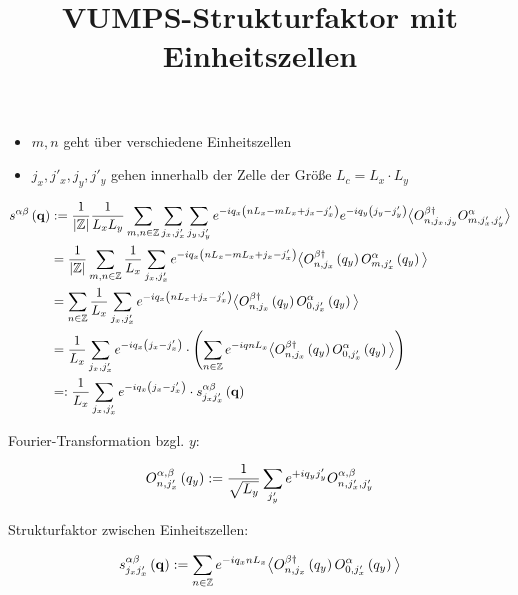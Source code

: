 \documentclass[12pt,paper=a4,BCOR=16mm]{article}
\title{VUMPS-Strukturfaktor mit Einheitszellen}
\begin{document}
\maketitle

\begin{itemize}
\item $m,n$ geht \"uber verschiedene Einheitszellen
\item $j_x,j'_x,j_y,j'_y$ gehen innerhalb der Zelle der Gr\"o{\ss}e $L_c=L_x \cdot L_y$
\end{itemize}

\begin{equation}
\begin{split}
s^{\alpha\beta}\left(\mathbf{q}\right) &:=\frac{1}{\left|\mathbb{Z}\right|}  \frac{1}{L_xL_y} \sum_{m,n\in\mathbb{Z}} \sum_{j_x,j'_x} \sum_{j_y,j'_y} e^{-iq_x\left(nL_x-mL_x+j_x-j'_x\right)} e^{-iq_y\left(j_y-j'_y\right)} \big< O^{\beta\dagger}_{n,j_x,j_y} O^{\alpha}_{m,j'_x,j'_y} \big>\\
                      &= \frac{1}{\left|\mathbb{Z}\right|} \sum_{m,n\in\mathbb{Z}} \frac{1}{L_x} \sum_{j_x,j'_x} e^{-iq_x\left(nL_x-mL_x+j_x-j'_x\right)} \big< O^{\beta\dagger}_{n,j_x}\left(q_y\right) O^{\alpha}_{m,j'_x}\left(q_y\right) \big>\\
                      &= \sum_{n\in\mathbb{Z}} \frac{1}{L_x} \sum_{j_x,j'_x} e^{-iq_x\left(nL_x+j_x-j'_x\right)} \big< O^{\beta\dagger}_{n,j_x}\left(q_y\right) O^{\alpha}_{0,j'_x}\left(q_y\right) \big>\\
                      &= \frac{1}{L_x} \sum_{j_x,j'_x} e^{-iq_x\left(j_x-j'_x\right)} \cdot \left( \sum_{n\in\mathbb{Z}} e^{-iqnL_x} \big< O^{\beta\dagger}_{n,j_x}\left(q_y\right) O^{\alpha}_{0,j'_x}\left(q_y\right) \big> \right)\\
                      &=: \frac{1}{L_x} \sum_{j_x,j'_x} e^{-iq_x\left(j_x-j'_x\right)} \cdot s^{\alpha\beta}_{j_xj'_x}\left(\mathbf{q}\right)
\end{split}
\end{equation}

Fourier-Transformation bzgl. $y$:

\begin{equation}
O^{\alpha,\beta}_{n,j'_x}\left(q_y\right) := \frac{1}{\sqrt{L_y}} \sum_{j'_y} e^{+iq_yj'_y} O^{\alpha,\beta}_{n,j'_x,j'_y}
\end{equation}

Strukturfaktor zwischen Einheitszellen:

\begin{equation}
s^{\alpha\beta}_{j_xj'_x}\left(\mathbf{q}\right) := \sum_{n\in\mathbb{Z}} e^{-iq_xnL_x} \big< O^{\beta\dagger}_{n,j_x}\left(q_y\right) O^{\alpha}_{0,j'_x}\left(q_y\right) \big>
\end{equation}
\end{document}
